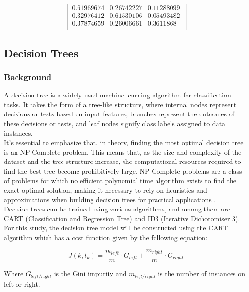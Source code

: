 \documentclass{article}
\begin{document}
\begin{align*}
\begin{bmatrix}
0.61969674 & 0.26742227 & 0.11288099 \\
0.32976412 & 0.61530106 & 0.05493482 \\
0.37874659 & 0.26006661 & 0.3611868 \\
\end{bmatrix}
\end{align*}

\subsection{Decision Trees}
\subsubsection{Background}

A decision tree is a widely used machine learning algorithm for classification tasks. It takes the form of a tree-like structure, where internal nodes represent decisions or tests based on input features, branches represent the outcomes of these decisions or tests, and leaf nodes signify class labels assigned to data instances.\\

It's essential to emphasize that, in theory, finding the most optimal decision tree is an NP-Complete problem. This means that, as the size and complexity of the dataset and the tree structure increase, the computational resources required to find the best tree become prohibitively large. NP-Complete problems are a class of problems for which no efficient polynomial time algorithm exists to find the exact optimal solution, making it necessary to rely on heuristics and approximations when building decision trees for practical applications \cite{laurent1976}.\\

Decision trees can be trained using various algorithms, and among them are CART (Classification and Regression Tree) and ID3 (Iterative Dichotomiser 3). For this study, the decision tree model will be constructed using the CART algorithm which has a cost function given by the following equation:

\begin{equation}
    J(k, t_k) = \frac{m_{left}}{m} \cdot G_{left} + \frac{m_{right}}{m} \cdot G_{right}
\end{equation}

Where $G_{left/right}$ is the Gini impurity and $m_{left/right}$ is the number of instances on left or right.\\
\end{document}

